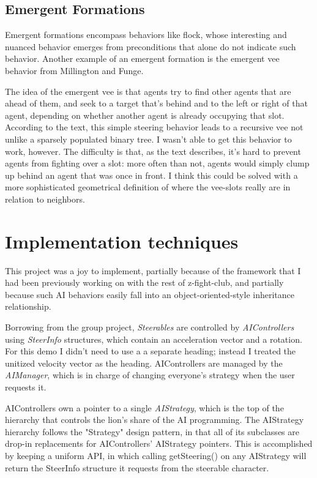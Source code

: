 \documentclass{article}
\begin{document}
\subsection {Emergent Formations}
Emergent formations encompass behaviors like flock, whose interesting and
nuanced behavior emerges from preconditions that alone do not indicate such
behavior. Another example of an emergent formation is the emergent vee
behavior from Millington and Funge.

The idea of the emergent vee is that agents try to find other agents that are
ahead of them, and seek to a target that's behind and to the left or right
of that agent, depending on whether another agent is already occupying that
slot. According to the text, this simple steering behavior leads to a
recursive vee not unlike a sparsely populated binary tree. I wasn't able to
get this behavior to work, however. The difficulty is that, as the text
describes, it's hard to prevent agents from fighting over a slot: more often
than not, agents would simply clump up behind an agent that was once in front.
I think this could be solved with a more sophisticated geometrical definition of
where the vee-slots really are in relation to neighbors.

\section {Implementation techniques}
This project was a joy to implement, partially because of the framework that I
had been previously working on with the rest of z-fight-club, and partially
because such AI behaviors easily fall into an object-oriented-style inheritance
relationship.

Borrowing from the group project, \emph{Steerables} are controlled by
\emph{AIControllers} using \emph{SteerInfo} structures, which contain an
acceleration vector and a rotation. For this demo I didn't need to use a
a separate heading; instead I treated the unitized velocity vector as the
heading. AIControllers are managed by the \emph{AIManager}, which is in charge
of changing everyone's strategy when the user requests it.

AIControllers own a pointer to a single \emph{AIStrategy}, which is the top
of the hierarchy that controls the lion's share of the AI programming. The
AIStrategy hierarchy follows the "Strategy" design pattern, in that all of its
subclasses are drop-in replacements for AIControllers' AIStrategy pointers.
This is accomplished by keeping a uniform API, in which calling getSteering()
on any AIStrategy will return the SteerInfo structure it requests from the
steerable character.
\end{document}
